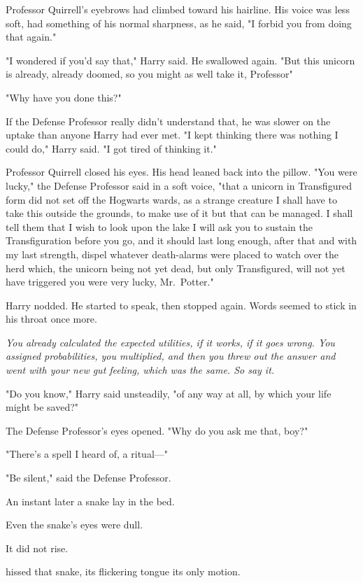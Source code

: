 Professor Quirrell's eyebrows had climbed toward his hairline. His voice was
less soft, had something of his normal sharpness, as he said, "I forbid you
from doing that again."

"I wondered if you'd say that," Harry said. He swallowed again. "But this
unicorn is already, already doomed, so you might as well take it,
Professor{\el}"

"Why have you done this?"

If the Defense Professor really didn't understand that, he was slower on the
uptake than anyone Harry had ever met. "I kept thinking there was nothing I
could do," Harry said. "I got tired of thinking it."

Professor Quirrell closed his eyes. His head leaned back into the pillow. "You
were lucky," the Defense Professor said in a soft voice, "that a unicorn in
Transfigured form{\el} did not set off the Hogwarts wards, as a strange
creature{\el} I shall have to{\el} take this outside the grounds, to make
use of it{\el} but that can be managed. I shall tell them that I wish to
look upon the lake{\el} I will ask you to sustain the Transfiguration before
you go, and it should last long enough, after that{\el} and with my last
strength, dispel whatever death-alarms were placed to watch over the
herd{\el} which, the unicorn being not yet dead, but only Transfigured, will
not yet have triggered{\el} you were very lucky, Mr.~Potter."

Harry nodded. He started to speak, then stopped again. Words seemed to stick in
his throat once more.

\emph{You already calculated the expected utilities, if it works, if it goes
wrong. You assigned probabilities, you multiplied, and then you threw out the
answer and went with your new gut feeling, which was the same. So say it.}

"Do you know," Harry said unsteadily, "of any way at all, by which your life
might be saved?"

The Defense Professor's eyes opened. "Why{\el} do you ask me that, boy?"

"There's{\el} a spell I heard of, a ritual\mbox{---}"

"Be silent," said the Defense Professor.

An instant later a snake lay in the bed.

Even the snake's eyes were dull.

It did not rise.

 hissed that snake, its flickering tongue its only motion.

